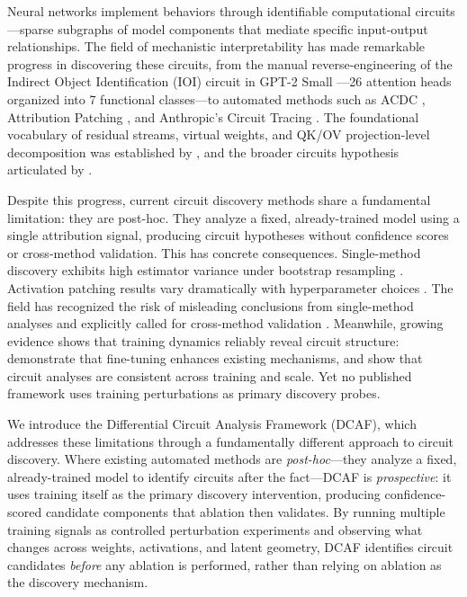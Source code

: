 \documentclass[11pt]{article}
\begin{document}
Neural networks implement behaviors through identifiable computational circuits---sparse subgraphs of model components that mediate specific input-output relationships. The field of mechanistic interpretability has made remarkable progress in discovering these circuits, from the manual reverse-engineering of the Indirect Object Identification (IOI) circuit in GPT-2 Small \citep{wang2023ioi}---26 attention heads organized into 7 functional classes---to automated methods such as ACDC \citep{conmy2023acdc}, Attribution Patching \citep{syed2024attribution}, and Anthropic's Circuit Tracing \citep{ameisen2025tracing}. The foundational vocabulary of residual streams, virtual weights, and QK/OV projection-level decomposition was established by \citet{elhage2021mathematical}, and the broader circuits hypothesis articulated by \citet{olah2020zoom}.

Despite this progress, current circuit discovery methods share a fundamental limitation: they are post-hoc. They analyze a fixed, already-trained model using a single attribution signal, producing circuit hypotheses without confidence scores or cross-method validation. This has concrete consequences. Single-method discovery exhibits high estimator variance under bootstrap resampling \citep{meloux2025variance}. Activation patching results vary dramatically with hyperparameter choices \citep{zhang2024bestpractices}. The field has recognized the risk of misleading conclusions from single-method analyses and explicitly called for cross-method validation \citep{sharkey2025openproblems}. Meanwhile, growing evidence shows that training dynamics reliably reveal circuit structure: \citet{prakash2024finetuning} demonstrate that fine-tuning enhances existing mechanisms, and \citet{tigges2024consistent} show that circuit analyses are consistent across training and scale. Yet no published framework uses training perturbations as primary discovery probes.

We introduce the Differential Circuit Analysis Framework (DCAF), which addresses these limitations through a fundamentally different approach to circuit discovery. Where existing automated methods are \emph{post-hoc}---they analyze a fixed, already-trained model to identify circuits after the fact---DCAF is \emph{prospective}: it uses training itself as the primary discovery intervention, producing confidence-scored candidate components that ablation then validates. By running multiple training signals as controlled perturbation experiments and observing what changes across weights, activations, and latent geometry, DCAF identifies circuit candidates \emph{before} any ablation is performed, rather than relying on ablation as the discovery mechanism.
\end{document}
